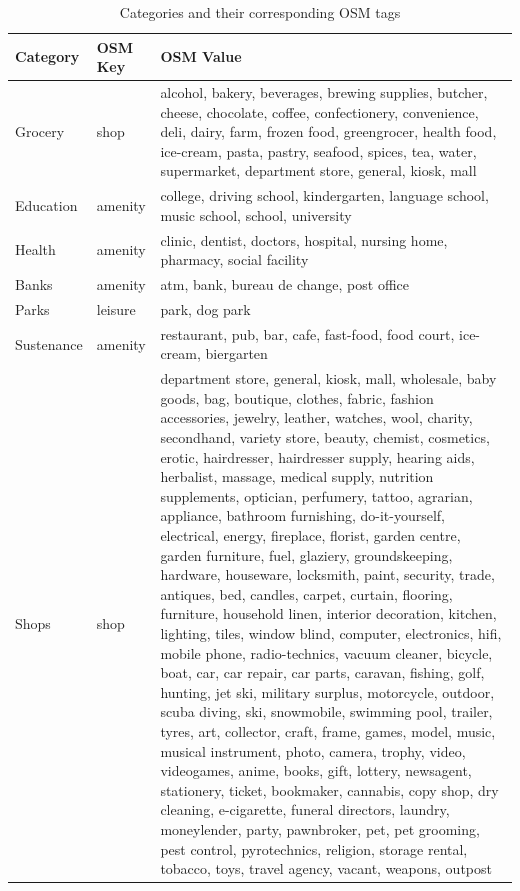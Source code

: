\begin{table}[ht]
\centering
\caption{Categories and their corresponding OSM tags}
\label{tab:categories}
\footnotesize
\begin{tabular}{|l|l|p{10cm}|}
\hline
\textbf{Category} & \textbf{OSM Key} & \textbf{OSM Value} \\ \hline
Grocery           & shop             & alcohol, bakery, beverages, brewing supplies, butcher, cheese, chocolate, coffee, confectionery, convenience, deli, dairy, farm, frozen food, greengrocer, health food, ice-cream, pasta, pastry, seafood, spices, tea, water, supermarket, department store, general, kiosk, mall \\ \hline
Education         & amenity          & college, driving school, kindergarten, language school, music school, school, university \\ \hline
Health            & amenity          & clinic, dentist, doctors, hospital, nursing home, pharmacy, social facility \\ \hline
Banks             & amenity          & atm, bank, bureau de change, post office \\ \hline
Parks             & leisure          & park, dog park \\ \hline
Sustenance        & amenity          & restaurant, pub, bar, cafe, fast-food, food court, ice-cream, biergarten \\ \hline
Shops             & shop             & department store, general, kiosk, mall, wholesale, baby goods, bag, boutique, clothes, fabric, fashion accessories, jewelry, leather, watches, wool, charity, secondhand, variety store, beauty, chemist, cosmetics, erotic, hairdresser, hairdresser supply, hearing aids, herbalist, massage, medical supply, nutrition supplements, optician, perfumery, tattoo, agrarian, appliance, bathroom furnishing, do-it-yourself, electrical, energy, fireplace, florist, garden centre, garden furniture, fuel, glaziery, groundskeeping, hardware, houseware, locksmith, paint, security, trade, antiques, bed, candles, carpet, curtain, flooring, furniture, household linen, interior decoration, kitchen, lighting, tiles, window blind, computer, electronics, hifi, mobile phone, radio-technics, vacuum cleaner, bicycle, boat, car, car repair, car parts, caravan, fishing, golf, hunting, jet ski, military surplus, motorcycle, outdoor, scuba diving, ski, snowmobile, swimming pool, trailer, tyres, art, collector, craft, frame, games, model, music, musical instrument, photo, camera, trophy, video, videogames, anime, books, gift, lottery, newsagent, stationery, ticket, bookmaker, cannabis, copy shop, dry cleaning, e-cigarette, funeral directors, laundry, moneylender, party, pawnbroker, pet, pet grooming, pest control, pyrotechnics, religion, storage rental, tobacco, toys, travel agency, vacant, weapons, outpost \\ \hline
\end{tabular}
\normalsize
\end{table}

